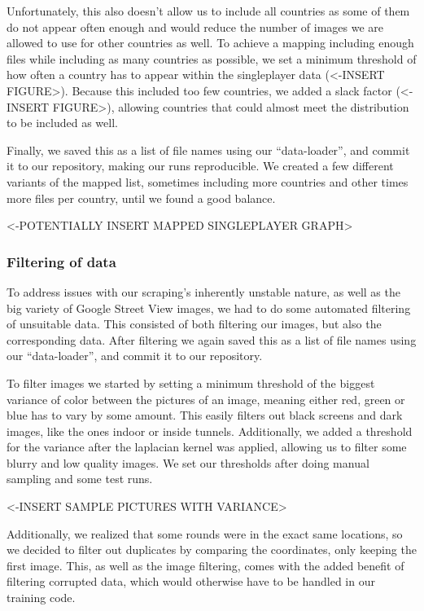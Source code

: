 Unfortunately, this also doesn't allow us to include all countries as
some of them do not appear often enough and would reduce the number of
images we are allowed to use for other countries as well. To achieve a
mapping including enough files while including as many countries as
possible, we set a minimum threshold of how often a country has to
appear within the singleplayer data (\textless-INSERT
FIGURE\textgreater). Because this included too few countries, we added a
slack factor (\textless-INSERT FIGURE\textgreater), allowing countries
that could almost meet the distribution to be included as well.

Finally, we saved this as a list of file names using our
``data-loader'', and commit it to our repository, making our runs
reproducible. We created a few different variants of the mapped list,
sometimes including more countries and other times more files per
country, until we found a good balance.

\textless-POTENTIALLY INSERT MAPPED SINGLEPLAYER GRAPH\textgreater{}

\subsubsection{Filtering of data}\label{filtering-of-data}

To address issues with our scraping's inherently unstable nature, as
well as the big variety of Google Street View images, we had to do some
automated filtering of unsuitable data. This consisted of both filtering
our images, but also the corresponding data. After filtering we again
saved this as a list of file names using our ``data-loader'', and commit
it to our repository.

To filter images we started by setting a minimum threshold of the
biggest variance of color between the pictures of an image, meaning
either red, green or blue has to vary by some amount. This easily
filters out black screens and dark images, like the ones indoor or
inside tunnels. Additionally, we added a threshold for the variance
after the laplacian kernel was applied, allowing us to filter some
blurry and low quality images. We set our thresholds after doing manual
sampling and some test runs.

\textless-INSERT SAMPLE PICTURES WITH VARIANCE\textgreater{}

Additionally, we realized that some rounds were in the exact same
locations, so we decided to filter out duplicates by comparing the
coordinates, only keeping the first image. This, as well as the image
filtering, comes with the added benefit of filtering corrupted data,
which would otherwise have to be handled in our training code.

